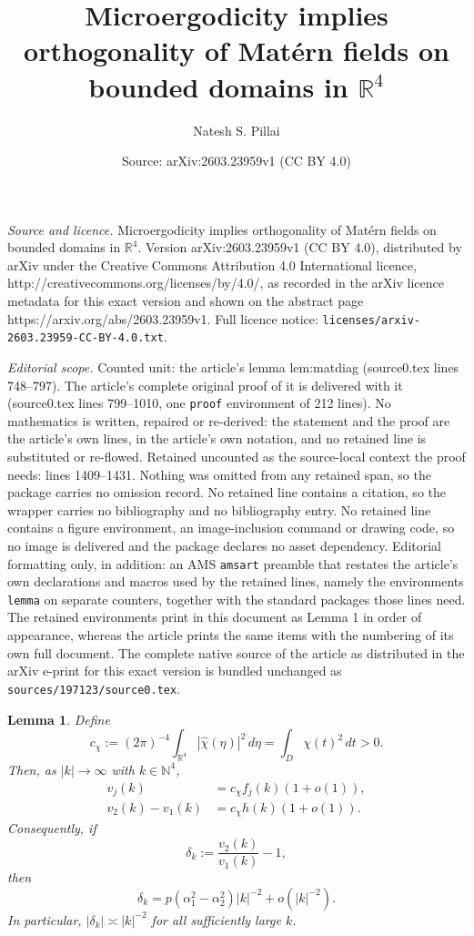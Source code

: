 \documentclass[10pt,a4paper]{amsart}
\title{Microergodicity implies orthogonality of Mat\'ern fields on bounded domains in $\mathbb{R}^4$}
\author{Natesh S. Pillai}
\date{Source: arXiv:2603.23959v1 (CC BY 4.0)}
\newtheorem{lemma}{Lemma}
\newcommand{\N}{\mathbb{N}}
\newcommand{\R}{\mathbb{R}}
\newcommand{\abs}[1]{\left\lvert #1 \right\rvert}
\newcommand{\what}[1]{\widehat{#1}}
\begin{document}
\maketitle

\noindent\emph{Source and licence.} Microergodicity implies orthogonality of Mat\'ern fields on bounded domains in $\mathbb{R}^4$. Version arXiv:2603.23959v1 (CC BY 4.0), distributed by arXiv under the Creative Commons Attribution 4.0 International licence, http://creativecommons.org/licenses/by/4.0/, as recorded in the arXiv licence metadata for this exact version and shown on the abstract page https://arxiv.org/abs/2603.23959v1. Full licence notice: \texttt{licenses/arxiv-2603.23959-CC-BY-4.0.txt}.\par\smallskip

\noindent\textit{Editorial scope.} Counted unit: the article's lemma lem:matdiag (source0.tex lines 748--797). The article's complete original proof of it is delivered with it (source0.tex lines 799--1010, one \texttt{proof} environment of 212 lines). No mathematics is written, repaired or re-derived: the statement and the proof are the article's own lines, in the article's own notation, and no retained line is substituted or re-flowed.  Retained uncounted as the source-local context the proof needs: lines 1409--1431.  Nothing was omitted from any retained span, so the package carries no omission record.  No retained line contains a citation, so the wrapper carries no bibliography and no bibliography entry.  No retained line contains a figure environment, an image-inclusion command or drawing code, so no image is delivered and the package declares no asset dependency.  Editorial formatting only, in addition: an AMS \texttt{amsart} preamble that restates the article's own declarations and macros used by the retained lines, namely the environments \texttt{lemma} on separate counters, together with the standard packages those lines need.  The retained environments print in this document as Lemma 1 in order of appearance, whereas the article prints the same items with the numbering of its own full document.  The complete native source of the article as distributed in the arXiv e-print for this exact version is bundled unchanged as \texttt{sources/197123/source0.tex}.
\begin{lemma}\label{lem:diagonal-asymptotics}
Define
\[
c_\chi:=(2\pi)^{-4}\int_{\R^4}\abs{\what\chi(\eta)}^2\,d\eta = \int_D \chi(t)^2\,dt >0.
\]
Then, as $\abs{k}\to\infty$ with $k\in\N^4$,
\begin{align}
v_j(k)&=c_\chi f_j(k)(1+o(1)),
\label{eq:vi-asymptotic}
\\
v_2(k)-v_1(k)&=c_\chi h(k)(1+o(1)).
\label{eq:diff-asymptotic}
\end{align}
Consequently, if
\begin{equation}\label{eq:delta-def}
\delta_k:=\frac{v_2(k)}{v_1(k)}-1,
\end{equation}
then
\begin{equation}\label{eq:delta-asymptotic}
\delta_k = p(\alpha_1^2-\alpha_2^2)\abs{k}^{-2}+o(\abs{k}^{-2}).
\end{equation}
In particular, $\abs{\delta_k}\asymp \abs{k}^{-2}$ for all sufficiently large $k$.
\end{lemma}
\end{document}
